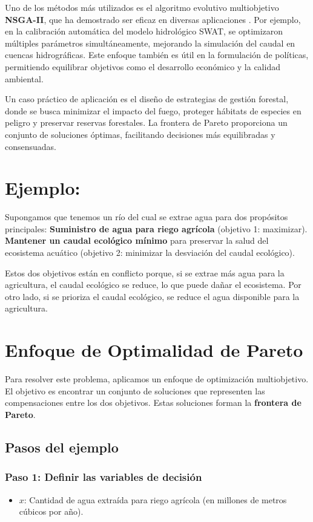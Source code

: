 \documentclass[12pt]{article}
\begin{document}
Uno de los métodos más utilizados es el algoritmo evolutivo multiobjetivo \textbf{NSGA-II}, que ha demostrado ser eficaz en diversas aplicaciones \cite{Confesor2007}. Por ejemplo, en la calibración automática del modelo hidrológico SWAT, se optimizaron múltiples parámetros simultáneamente, mejorando la simulación del caudal en cuencas hidrográficas. Este enfoque también es útil en la formulación de políticas, permitiendo equilibrar objetivos como el desarrollo económico y la calidad ambiental.  

Un caso práctico de aplicación es el diseño de estrategias de gestión forestal, donde se busca minimizar el impacto del fuego, proteger hábitats de especies en peligro y preservar reservas forestales. La frontera de Pareto proporciona un conjunto de soluciones óptimas, facilitando decisiones más equilibradas y consensuadas.  
  


\section*{Ejemplo:}
Supongamos que tenemos un río del cual se extrae agua para dos propósitos principales:
\textbf{Suministro de agua para riego agrícola} (objetivo 1: maximizar).
\textbf{Mantener un caudal ecológico mínimo} para preservar la salud del ecosistema acuático (objetivo 2: minimizar la desviación del caudal ecológico).

Estos dos objetivos están en conflicto porque, si se extrae más agua para la agricultura, el caudal ecológico se reduce, lo que puede dañar el ecosistema. Por otro lado, si se prioriza el caudal ecológico, se reduce el agua disponible para la agricultura.

\section*{Enfoque de Optimalidad de Pareto}
Para resolver este problema, aplicamos un enfoque de optimización multiobjetivo. El objetivo es encontrar un conjunto de soluciones que representen las compensaciones entre los dos objetivos. Estas soluciones forman la \textbf{frontera de Pareto}.

\subsection*{Pasos del ejemplo}

\subsubsection*{Paso 1: Definir las variables de decisión}  
\begin{itemize}
    \item \( x \): Cantidad de agua extraída para riego agrícola (en millones de metros cúbicos por año).
\end{itemize}
\end{document}

